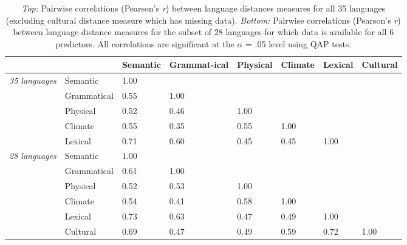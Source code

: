 \documentclass[9pt,twoside,lineno]{pnas-new}
\begin{document}
\begin{table}[h]
\centering
\begin{tabular}{llp{1.5cm}p{1.8cm}p{1.3cm}p{1.3cm}p{1.3cm}p{1.3cm}}

  & &  Semantic   &  Grammat-ical   &  Physical   &  Climate  &  Lexical    &  Cultural  \\ 
  \hline
    \hline
{\it 35 languages} & Semantic  & 1.00 & & &  & \\ 
& Grammatical  & 0.55 & 1.00 &  & & \\ 
& Physical  & 0.52 & 0.46 & 1.00 &  & \\ 
& Climate  & 0.55 & 0.35 & 0.55 & 1.00 & \\ 
& Lexical  & 0.71 & 0.60 & 0.45 & 0.45 & 1.00 \\ 
   \hline
{\it 28 languages} &   Semantic  & 1.00 &  &  & &  & \\ 
 &Grammatical  & 0.61 & 1.00 &  &&  & \\ 
&Physical  & 0.52 & 0.53 & 1.00 & & &\\ 
& Climate  & 0.54 & 0.41 & 0.58 & 1.00  &  &\\ 
&  Lexical  & 0.73 & 0.63 & 0.47 & 0.49& 1.00 & \\
&    Cultural  & 0.69 & 0.47 & 0.49 & 0.59 & 0.72  & 1.00\\ 
      \hline
        \hline
\end{tabular}
   \caption{ {\it Top:} Pairwise correlations (Pearson's {\it r}) between language distances measures for all 35 languages (excluding cultural distance measure which has  missing data). {\it Bottom:} Pairwise correlations (Pearson's {\it r}) between language distance measures for the subset of 28 languages for which data is available for all 6 predictors. All correlations are significant at the $\alpha$ = .05 level using QAP tests.} 
\end{table}

\pagebreak
 \clearpage







\end{document}
